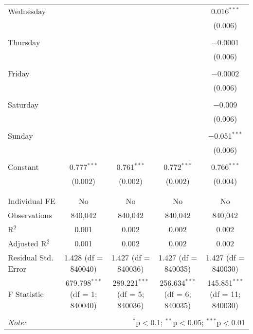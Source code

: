 \documentclass[
]{article}
\begin{document}
\begin{table}[!htbp]
{\begin{tabular}{@{\extracolsep{5pt}}lcccc}
 Wednesday &  &  &  & 0.016$^{***}$ \\ 
  &  &  &  & (0.006) \\ 
  & & & & \\ 
 Thursday &  &  &  & $-$0.0001 \\ 
  &  &  &  & (0.006) \\ 
  & & & & \\ 
 Friday &  &  &  & $-$0.0002 \\ 
  &  &  &  & (0.006) \\ 
  & & & & \\ 
 Saturday &  &  &  & $-$0.009 \\ 
  &  &  &  & (0.006) \\ 
  & & & & \\ 
 Sunday &  &  &  & $-$0.051$^{***}$ \\ 
  &  &  &  & (0.006) \\ 
  & & & & \\ 
 Constant & 0.777$^{***}$ & 0.761$^{***}$ & 0.772$^{***}$ & 0.766$^{***}$ \\ 
  & (0.002) & (0.002) & (0.002) & (0.004) \\ 
  & & & & \\ 
\hline \\[-1.8ex] 
Individual FE & No & No & No & No \\ 
Observations & 840,042 & 840,042 & 840,042 & 840,042 \\ 
R$^{2}$ & 0.001 & 0.002 & 0.002 & 0.002 \\ 
Adjusted R$^{2}$ & 0.001 & 0.002 & 0.002 & 0.002 \\ 
Residual Std. Error & 1.428 (df = 840040) & 1.427 (df = 840036) & 1.427 (df = 840035) & 1.427 (df = 840030) \\ 
F Statistic & 679.798$^{***}$ (df = 1; 840040) & 289.221$^{***}$ (df = 5; 840036) & 256.634$^{***}$ (df = 6; 840035) & 145.851$^{***}$ (df = 11; 840030) \\ 
\hline 
\hline \\[-1.8ex] 
\textit{Note:}  & \multicolumn{4}{r}{$^{*}$p$<$0.1; $^{**}$p$<$0.05; $^{***}$p$<$0.01} \\ 
\end{tabular}
} 
\end{table} 
\newpage
\end{document}
